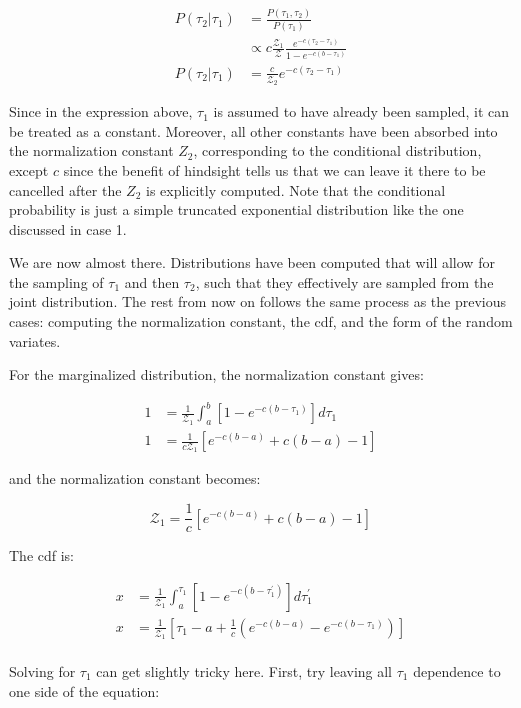 \documentclass[12pt, two sided]{article}
\begin{document}
\begin{align}
P(\tau_2 \vert \tau_1) &= \frac{P(\tau_1,\tau_2)}{P(\tau_1)} \\
&\propto c \frac{\mathcal{Z}_1}{\mathcal{Z}} \frac{e^{-c(\tau_2-\tau_1)}}{1-e^{-c(b-\tau_1)}} \\
P(\tau_2 \vert \tau_1) &= \frac{c}{\mathcal{Z}_2} e^{-c(\tau_2-\tau_1)}
\end{align}

Since in the expression above, $\tau_1$ is assumed to have already been sampled, it can be treated as a constant. Moreover, all other constants have been absorbed into the normalization constant $Z_2$, corresponding to the conditional distribution, except $c$ since the benefit of hindsight tells us that we can leave it there to be cancelled after the $Z_2$ is explicitly computed. Note that the conditional probability is just a simple truncated exponential distribution like the one discussed in case 1.

We are now almost there. Distributions have been computed that will allow for the sampling of $\tau_1$ and then $\tau_2$, such that they effectively are sampled from the joint distribution. The rest from now on follows the same process as the previous cases: computing the normalization constant, the cdf, and the form of the random variates.

For the marginalized distribution, the normalization constant gives:

\begin{align}
1 &= \frac{1}{\mathcal{Z}_1} \int_{a}^{b} [ 1-e^{-c(b-\tau_1)} ] d\tau_1\\
1 &= \frac{1}{c\mathcal{Z}_1} [e^{-c(b-a)}+c(b-a)-1]
\end{align}

and the normalization constant becomes:

\begin{equation}
\mathcal{Z}_1 = \frac{1}{c} [e^{-c(b-a)}+c(b-a)-1]
\end{equation}

The cdf is: 

\begin{align}
x &= \frac{1}{\mathcal{Z}_1} \int_{a}^{\tau_1} [ 1-e^{-c(b-\tau^{\prime}_1)} ] d\tau^{\prime}_1\\
x &= \frac{1}{\mathcal{Z}_1} [\tau_1 - a + \frac{1}{c} (e^{-c(b-a)}-e^{-c(b-\tau_1)})] \\
\end{align}

Solving for $\tau_1$ can get slightly tricky here. First, try leaving all $\tau_1$ dependence to one side of the equation:
\end{document}
